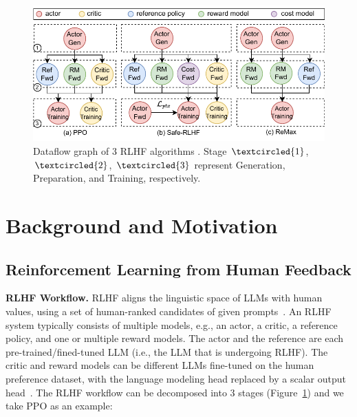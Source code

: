\begin{figure}[t]
    \centering
    \includegraphics[width=\linewidth]{figs/fig_dataflow_2.pdf}
    \vspace{-6.6mm}
    \caption{Dataflow graph of 3 RLHF algorithms \cite{ouyang2022training, daiSafeRLHFSafe2023, li2023remax}. 
    Stage $\textcircled{1}$, $\textcircled{2}$,  $\textcircled{3}$
    represent Generation, Preparation, and Training, respectively.
    }
    \vspace{-2.4mm}
    \label{fig:rlhf_dataflow}
\end{figure}

\section{Background and Motivation} \label{sec:2_bckground_and_motivation}


\subsection{Reinforcement Learning from Human Feedback} \label{sec:2_1_bckgroud_rlhf}
\noindent\textbf{RLHF Workflow.}
RLHF %
aligns the linguistic space of %
LLMs with human values, using a set of human-ranked candidates of given prompts~\cite{ouyang2022training, bai2022training, daiSafeRLHFSafe2023, shao2024deepseekmath, li2023remax, zheng2023improving, lee2023rlaif}.
An RLHF system typically consists of multiple models, e.g., an actor, a critic, a reference policy, and one or multiple
reward models. The actor and the reference are each pre-trained/fined-tuned LLM (i.e., the LLM that is undergoing RLHF). The critic and reward models can be different LLMs fine-tuned on the human preference dataset, with the language
modeling head replaced by a scalar output head~\cite{ouyang2022training, bai2022training}.
The RLHF workflow can be decomposed into 3 stages (Figure~\ref{fig:rlhf_dataflow}) and we take PPO as an example:


